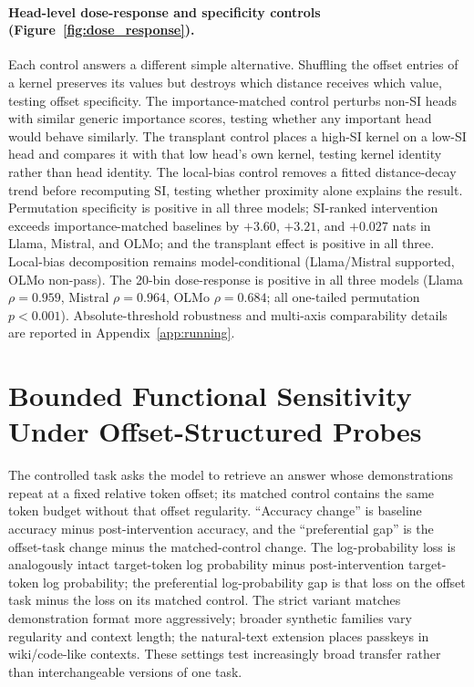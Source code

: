 \documentclass{article}
\begin{document}
\paragraph{Head-level dose-response and specificity controls (Figure~\ref{fig:dose_response}).}
Each control answers a different simple alternative.
Shuffling the offset entries of a kernel preserves its values but destroys which distance receives which value, testing offset specificity.
The importance-matched control perturbs non-SI heads with similar generic importance scores, testing whether any important head would behave similarly.
The transplant control places a high-SI kernel on a low-SI head and compares it with that low head's own kernel, testing kernel identity rather than head identity.
The local-bias control removes a fitted distance-decay trend before recomputing SI, testing whether proximity alone explains the result.
Permutation specificity is positive in all three models; SI-ranked intervention exceeds importance-matched baselines by $+3.60$, $+3.21$, and $+0.027$ nats in Llama, Mistral, and OLMo; and the transplant effect is positive in all three.
Local-bias decomposition remains model-conditional (Llama/Mistral supported, OLMo non-pass).
The 20-bin dose-response is positive in all three models (Llama $\rho=0.959$, Mistral $\rho=0.964$, OLMo $\rho=0.684$; all one-tailed permutation $p<0.001$).
Absolute-threshold robustness and multi-axis comparability details are reported in Appendix~\ref{app:running}.

\section{Bounded Functional Sensitivity Under Offset-Structured Probes}
\label{sec:functional}

The controlled task asks the model to retrieve an answer whose demonstrations repeat at a fixed relative token offset; its matched control contains the same token budget without that offset regularity.
``Accuracy change'' is baseline accuracy minus post-intervention accuracy, and the ``preferential gap'' is the offset-task change minus the matched-control change. The log-probability loss is analogously intact target-token log probability minus post-intervention target-token log probability; the preferential log-probability gap is that loss on the offset task minus the loss on its matched control.
The strict variant matches demonstration format more aggressively; broader synthetic families vary regularity and context length; the natural-text extension places passkeys in wiki/code-like contexts.
These settings test increasingly broad transfer rather than interchangeable versions of one task.
\end{document}
